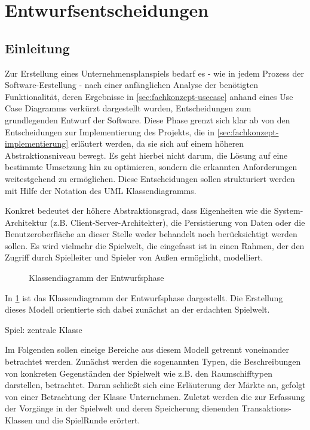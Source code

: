 \section{Entwurfsentscheidungen}
\label{sec:fachkonzept-entwurf}

\subsection{Einleitung}
Zur Erstellung eines Unternehmensplanspiels bedarf es - wie in jedem Prozess der Software-Erstellung - nach einer anfänglichen Analyse der benötigten Funktionalität, deren Ergebnisse in \ref{sec:fachkonzept-usecase} anhand eines Use Case Diagramms verkürzt dargestellt wurden, Entscheidungen zum grundlegenden Entwurf der Software. Diese Phase grenzt sich klar ab von den Entscheidungen zur Implementierung des Projekts, die in \ref{sec:fachkonzept-implementierung} erläutert werden, da sie sich auf einem höheren Abstraktionsniveau bewegt. Es geht hierbei nicht darum, die Lösung auf eine bestimmte Umsetzung hin zu optimieren, sondern die erkannten Anforderungen weitestgehend zu ermöglichen. Diese Entscheidungen sollen strukturiert werden mit Hilfe der Notation des UML Klassendiagramms.

Konkret bedeutet der höhere Abstraktionsgrad, dass Eigenheiten wie die System-Architektur (z.B. Client-Server-Architekter), die Persistierung von Daten oder die Benutzeroberfläche an dieser Stelle weder behandelt noch berücksichtigt werden sollen. Es wird vielmehr die Spielwelt, die eingefasst ist in einen Rahmen, der den Zugriff durch Spielleiter und Spieler von Außen ermöglicht, modelliert.

\begin{figure}

\caption{Klassendiagramm der Entwurfsphase}
\label{img:fachkonzept-entwurf-klassendiagramm}
\end{figure}

In \ref{img:fachkonzept-entwurf-klassendiagramm} ist das Klassendiagramm der Entwurfsphase dargestellt. Die Erstellung dieses Modell orientierte sich dabei zunächst an der erdachten Spielwelt. 

Spiel: zentrale Klasse

Im Folgenden sollen eineige Bereiche aus diesem Modell getrennt voneinander betrachtet werden. Zunächst werden die sogenannten Typen, die Beschreibungen von konkreten Gegenständen der Spielwelt wie z.B. den Raumschifftypen darstellen, betrachtet. Daran schließt sich eine Erläuterung der Märkte an, gefolgt von einer Betrachtung der Klasse Unternehmen. Zuletzt werden die zur Erfassung der Vorgänge in der Spielwelt und deren Speicherung dienenden Transaktions-Klassen und die SpielRunde erörtert.

